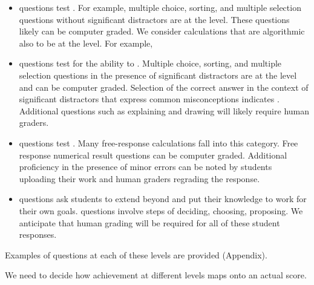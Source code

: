 \documentclass[10pt,letterpaper]{article}
\begin{document}
\begin{itemize}
\item \Recall questions test . For example, multiple choice, sorting, and multiple selection questions without significant distractors are at the \recall level. These questions likely can be computer graded. We consider calculations that are algorithmic also to be at the \recall level. For example,  
\item \Comprehension questions test for the ability to . Multiple choice, sorting,  and multiple selection questions in the presence of  significant distractors are at the \comprehension level and can be computer graded. Selection of the correct answer in the context of significant distractors that express common misconceptions indicates \comprehension. Additional questions such as explaining and drawing will likely require human graders.
\item \Analysis questions test . Many free-response calculations fall into this category. Free response numerical result questions can be computer graded. Additional proficiency in the presence of minor errors can be noted by students uploading their work and human graders regrading the response.
\item \Use questions ask students to extend beyond \analysis and put their knowledge to work for their own goals. \Use questions involve steps of deciding, choosing, proposing. We anticipate that human grading will be required for all of these student responses.
\end{itemize}
Examples of questions at each of these levels are provided (Appendix).
%

 We need to decide how achievement at different levels maps onto an actual score. 
\end{document}
